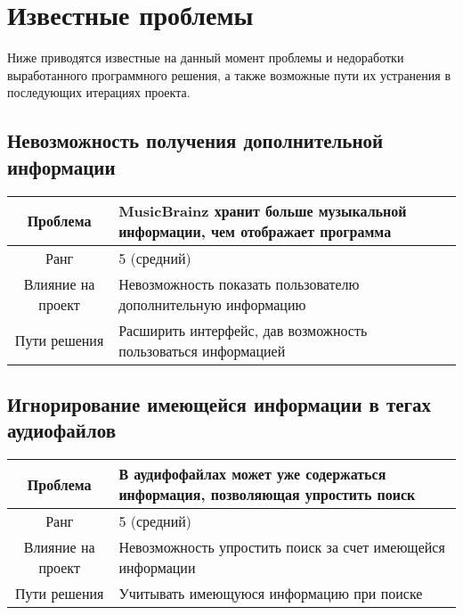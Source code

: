 \documentclass[pdftex,12pt,a4paper]{report}
\begin{document}
\section{Известные проблемы}
Ниже приводятся известные на данный момент проблемы и недоработки выработанного программного решения, а также возможные пути их устранения в последующих итерациях проекта.

\subsection{Невозможность получения дополнительной информации}
\begin{table}[h]
\begin{tabular}{|c|p{10cm}|} \hline
\cellcolor[gray]{0.9} Проблема  & MusicBrainz хранит больше музыкальной информации, чем отображает программа \\ \hline
\cellcolor[gray]{0.9} Ранг  & 5 (средний) \\ \hline
\cellcolor[gray]{0.9} Влияние на проект & Невозможность показать пользователю дополнительную информацию \\ \hline
\cellcolor[gray]{0.9} Пути решения  & Расширить интерфейс, дав возможность пользоваться информацией\\ \hline
\end{tabular}
\end{table}

\subsection{Игнорирование имеющейся информации в тегах аудиофайлов}
\begin{table}[h]
\begin{tabular}{|c|p{10cm}|} \hline
\cellcolor[gray]{0.9} Проблема  & В аудифофайлах может уже содержаться информация, позволяющая упростить поиск \\ \hline
\cellcolor[gray]{0.9} Ранг  & 5 (средний) \\ \hline
\cellcolor[gray]{0.9} Влияние на проект & Невозможность упростить поиск за счет имеющейся информации \\ \hline
\cellcolor[gray]{0.9} Пути решения  & Учитывать имеющуюся информацию при поиске \\ \hline
\end{tabular}
\end{table}
\end{document}
